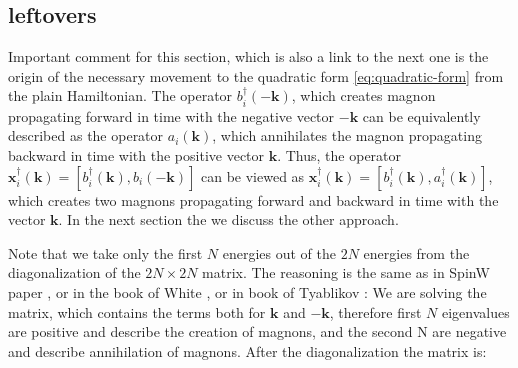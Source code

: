 \documentclass[a4paper,12pt]{article}
\begin{document}
 
        \subsection{leftovers}
            Important comment for this section, which is also a link to the next one is the origin of the necessary movement to the quadratic form \eqref{eq:quadratic-form} from the plain Hamiltonian.
            The operator $b^{\dag}_i(-\boldsymbol{k})$, which creates magnon propagating forward in time with the negative vector $-\boldsymbol{k}$ can be equivalently described as the operator
            $a_i(\boldsymbol{k})$, which annihilates the magnon propagating backward in time with the positive vector $\boldsymbol{k}$. 
            Thus, the operator $\boldsymbol{x}_i^{\dag}(\boldsymbol{k}) = [b^{\dag}_i(\boldsymbol{k}), b_i(-\boldsymbol{k})]$ can be viewed as 
            $\boldsymbol{x}_i^{\dag}(\boldsymbol{k}) = [b^{\dag}_i(\boldsymbol{k}), a^{\dag}_i(\boldsymbol{k})]$,
            which creates two magnons propagating forward and backward in time with the vector $\boldsymbol{k}$. In the next section the we discuss the other approach.

            Note that we take only the first $N$ energies out of the $2N$ energies from the 
            diagonalization of the $2N\times 2N$ matrix. The reasoning is the same as in SpinW paper \cite{toth2015linear}, 
            or in the book of White \cite{white1983quantum}, or in book of Tyablikov \cite{Tyablikov1975methods}: 
            We are solving the matrix, which contains the terms both for $\boldsymbol{k}$ and $-\boldsymbol{k}$, therefore first $N$ eigenvalues are positive and describe the creation of magnons, 
            and the second N are negative and describe annihilation of magnons. After the diagonalization the matrix is:
    
    

    

     
     



\end{document}
